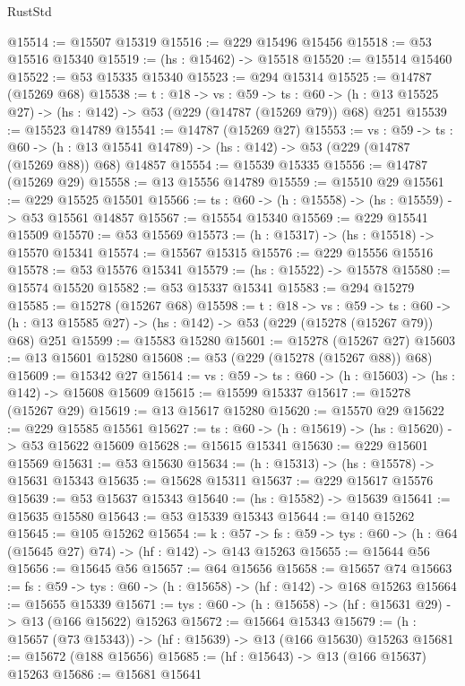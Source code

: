\begin{lexlean}{RustStd}
\begin{coremodule}
@15514 := @15507 @15319
@15516 := @229 @15496 @15456
@15518 := @53 @15516 @15340
@15519 := (hs : @15462) -> @15518
@15520 := @15514 @15460
@15522 := @53 @15335 @15340
@15523 := @294 @15314
@15525 := @14787 (@15269 @68)
@15538 := {t : @18} ->
  {vs : @59} ->
  {ts : @60} -> (h : @13 @15525 @27) -> (hs : @142) -> @53 (@229 (@14787 (@15269 @79)) @68) @251
@15539 := @15523 @14789
@15541 := @14787 (@15269 @27)
@15553 := {vs : @59} ->
  {ts : @60} ->
  (h : @13 @15541 @14789) -> (hs : @142) -> @53 (@229 (@14787 (@15269 @88)) @68) @14857
@15554 := @15539 @15335
@15556 := @14787 (@15269 @29)
@15558 := @13 @15556 @14789
@15559 := @15510 @29
@15561 := @229 @15525 @15501
@15566 := {ts : @60} -> (h : @15558) -> (hs : @15559) -> @53 @15561 @14857
@15567 := @15554 @15340
@15569 := @229 @15541 @15509
@15570 := @53 @15569
@15573 := (h : @15317) -> (hs : @15518) -> @15570 @15341
@15574 := @15567 @15315
@15576 := @229 @15556 @15516
@15578 := @53 @15576 @15341
@15579 := (hs : @15522) -> @15578
@15580 := @15574 @15520
@15582 := @53 @15337 @15341
@15583 := @294 @15279
@15585 := @15278 (@15267 @68)
@15598 := {t : @18} ->
  {vs : @59} ->
  {ts : @60} -> (h : @13 @15585 @27) -> (hs : @142) -> @53 (@229 (@15278 (@15267 @79)) @68) @251
@15599 := @15583 @15280
@15601 := @15278 (@15267 @27)
@15603 := @13 @15601 @15280
@15608 := @53 (@229 (@15278 (@15267 @88)) @68)
@15609 := @15342 @27
@15614 := {vs : @59} -> {ts : @60} -> (h : @15603) -> (hs : @142) -> @15608 @15609
@15615 := @15599 @15337
@15617 := @15278 (@15267 @29)
@15619 := @13 @15617 @15280
@15620 := @15570 @29
@15622 := @229 @15585 @15561
@15627 := {ts : @60} -> (h : @15619) -> (hs : @15620) -> @53 @15622 @15609
@15628 := @15615 @15341
@15630 := @229 @15601 @15569
@15631 := @53 @15630
@15634 := (h : @15313) -> (hs : @15578) -> @15631 @15343
@15635 := @15628 @15311
@15637 := @229 @15617 @15576
@15639 := @53 @15637 @15343
@15640 := (hs : @15582) -> @15639
@15641 := @15635 @15580
@15643 := @53 @15339 @15343
@15644 := @140 @15262
@15645 := @105 @15262
@15654 := {k : @57} ->
  {fs : @59} -> {tys : @60} -> (h : @64 (@15645 @27) @74) -> (hf : @142) -> @143 @15263
@15655 := @15644 @56
@15656 := @15645 @56
@15657 := @64 @15656
@15658 := @15657 @74
@15663 := {fs : @59} -> {tys : @60} -> (h : @15658) -> (hf : @142) -> @168 @15263
@15664 := @15655 @15339
@15671 := {tys : @60} -> (h : @15658) -> (hf : @15631 @29) -> @13 (@166 @15622) @15263
@15672 := @15664 @15343
@15679 := (h : @15657 (@73 @15343)) -> (hf : @15639) -> @13 (@166 @15630) @15263
@15681 := @15672 (@188 @15656)
@15685 := (hf : @15643) -> @13 (@166 @15637) @15263
@15686 := @15681 @15641

\end{coremodule}
\end{lexlean}
